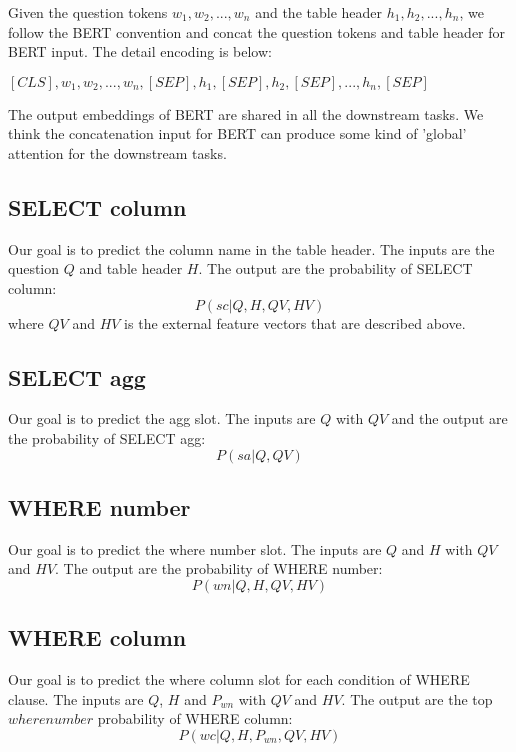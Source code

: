 \documentclass{llncs}
\begin{document}
Given the question tokens ${w_1,w_2,...,w_n}$ and the table header ${h_1,h_2,...,h_n}$, we follow the BERT convention and concat the question tokens and table header for BERT input. The detail encoding is below:

$[CLS],w_1,w_2,...,w_n, [SEP], h_1, [SEP], h_2, [SEP],..., h_n,[SEP] $

The output embeddings of BERT are shared in all the downstream tasks. We think the concatenation input for BERT can produce some kind of 'global' attention for the downstream tasks.

\subsection{SELECT column}
Our goal is to predict the column name in the table header. The inputs are the question $Q$ and table header $H$. The output are the probability of SELECT column: 
\begin{equation}
P(sc|Q,H,QV,HV)
\end{equation}
where $QV$ and $HV$ is the external feature vectors that are described above.
\subsection{SELECT agg}
Our goal is to predict the agg slot. The inputs are $Q$  with $QV$ and the output are the probability of SELECT agg:
\begin{equation}
P(sa|Q,QV) 
\end{equation}

\subsection{WHERE number}

Our goal is to predict the where number slot. The inputs are $Q$ and $H$ with $QV$ and $HV$. The output are the probability of WHERE number:
\begin{equation}
P(wn|Q,H,QV,HV) 
\end{equation}

\subsection{WHERE column}

Our goal is to predict the where column slot for each condition of WHERE clause. The inputs are $Q$, $H$ and $P_{wn}$ with $QV$ and $HV$. The output are the top $wherenumber$ probability of WHERE column:
\begin{equation}
P(wc|Q,H,P_{wn},QV,HV) 
\end{equation}
\end{document}
